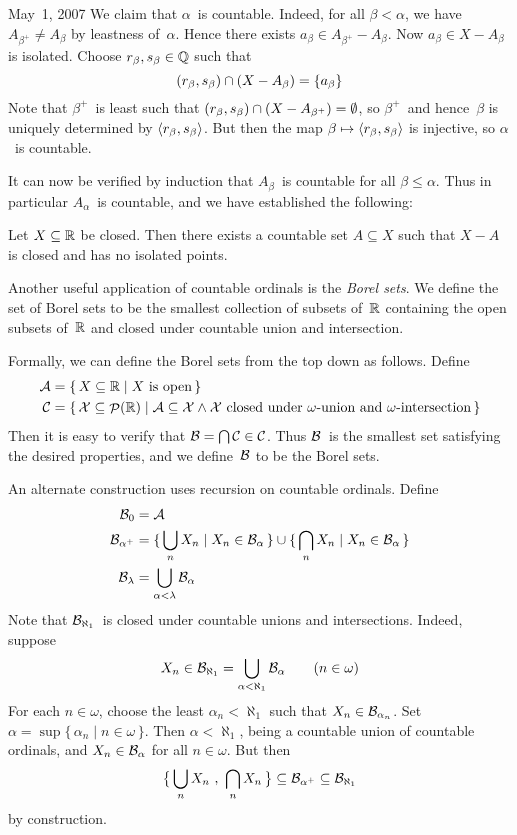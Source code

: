 \begin{lecture}{May~1, 2007}
We claim that \(\alpha\)~is countable. Indeed, for all \(\beta<\alpha\), we have \(A_{\beta^+}\ne A_{\beta}\) by leastness of~\(\alpha\). Hence there exists \(a_{\beta}\in A_{\beta^+}-A_{\beta}\). Now \(a_{\beta}\in X-A_{\beta}\) is isolated. Choose \(r_{\beta},s_{\beta}\in\mathbb{Q}\) such that
\[(r_{\beta},s_{\beta})\cap(X-A_{\beta})=\{a_{\beta}\}\]
Note that \(\beta^+\)~is least such that \((r_{\beta},s_{\beta})\cap(X-A_{\beta^+})=\emptyset\), so \(\beta^+\)~and hence~\(\beta\) is uniquely determined by \(\langle{r_{\beta}},{s_{\beta}}\rangle\). But then the map \(\beta\mapsto\langle{r_{\beta}},{s_{\beta}}\rangle\) is injective, so \(\alpha\)~is countable.

It can now be verified by induction that \(A_{\beta}\)~is countable for all \(\beta\le\alpha\). Thus in particular \(A_{\alpha}\)~is countable, and we have established the following:
\begin{thm}
Let \(X\subseteq\mathbb{R}\) be closed. Then there exists a countable set \(A\subseteq X\) such that \(X-A\) is closed and has no isolated points.
\end{thm}

Another useful application of countable ordinals is the \emph{Borel sets}. We define the set of Borel sets to be the smallest collection of subsets of~\(\mathbb{R}\) containing the open subsets of~\(\mathbb{R}\) and closed under countable union and intersection.

Formally, we can define the Borel sets from the top down as follows. Define
\begin{align*}
\mathcal{A}&=\{\,X\subseteq\mathbb{R}\mid X\text{ is open}\,\}\\
\mathcal{C}&=\{\,\mathcal{X}\subseteq\mathop{\mathcal{P}}(\mathbb{R})\mid \mathcal{A}\subseteq\mathcal{X}\land \mathcal{X}\text{ closed under } \omega\text{-union and }\omega\text{-intersection}\,\}
\end{align*}
Then it is easy to verify that \(\mathcal{B}=\bigcap\mathcal{C}\in\mathcal{C}\). Thus \(\mathcal{B}\)~is the smallest set satisfying the desired properties, and we define~\(\mathcal{B}\) to be the Borel sets.

An alternate construction uses recursion on countable ordinals. Define
\begin{align*}
\mathcal{B}_0&=\mathcal{A}\\
\mathcal{B}_{\alpha^+}&=\{\,\bigcup_n X_n\mid X_n\in\mathcal{B}_{\alpha}\,\}\cup\{\,\bigcap_n X_n\mid X_n\in\mathcal{B}_{\alpha}\,\}\\
\mathcal{B}_{\lambda}&=\bigcup_{\alpha<\lambda}\mathcal{B}_{\alpha}
\end{align*}
Note that \(\mathcal{B}_{\aleph_1}\)~is closed under countable unions and intersections. Indeed, suppose
\[X_n\in\mathcal{B}_{\aleph_1}=\bigcup_{\alpha<\aleph_1}\mathcal{B}_{\alpha}\qquad (n\in\omega)\]
For each \(n\in\omega\), choose the least \(\alpha_n<\aleph_1\) such that \(X_n\in\mathcal{B}_{\alpha_n}\). Set \(\alpha=\sup\{\,\alpha_n\mid n\in\omega\,\}\). Then \(\alpha<\aleph_1\), being a countable union of countable ordinals, and \(X_n\in\mathcal{B}_{\alpha}\) for all \(n\in\omega\). But then
\[\bigl\{\,\bigunion_n X_n\ ,\ \bigsect_n X_n\,\bigr\}\subseteq\B_{\alpha^+}\subseteq\B_{\aleph_1}\]
by construction.


\end{lecture}
